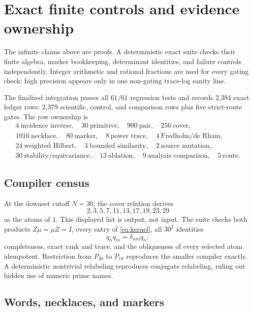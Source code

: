 \section{Exact finite controls and evidence ownership}
\label{sec:exact}

The infinite claims above are proofs. A deterministic exact suite checks their
finite algebra, marker bookkeeping, determinant identities, and failure
controls independently. Integer arithmetic and rational fractions are used
for every gating check; high precision appears only in one non-gating
trace-log sanity line.

The finalized integration passes all \(61/61\) regression tests and records
2,384 exact ledger rows: 2,379 scientific, control, and comparison rows plus
five strict-route gates. The row ownership is
\[
\begin{gathered}
4\ \text{incidence inverse},\quad
30\ \text{primitive},\quad
900\ \text{pair},\quad
256\ \text{cover},\\
1016\ \text{necklace},\quad
80\ \text{marker},\quad
8\ \text{power trace},\quad
4\ \text{Fredholm/de Rham},\\
24\ \text{weighted Hilbert},\quad
3\ \text{bounded similarity},\quad
2\ \text{source mutation},\\
30\ \text{stability/equivariance},\quad
13\ \text{ablation},\quad
9\ \text{analysis comparison},\quad
5\ \text{route}.
\end{gathered}
\]

\subsection{Compiler census}

At the downset cutoff \(N=30\), the cover relation derives
\[
2,3,5,7,11,13,17,19,23,29
\]
as the atoms of \(1\). This displayed list is output, not input. The suite
checks both products \(Z\mu=\mu Z=I\), every entry of
\eqref{eq:kernel}, all \(30^2\) identities
\[
q_nq_m=\delta_{nm}q_n,
\]
completeness, exact rank and trace, and the obliqueness of every selected atom
idempotent. Restriction from \(P_{30}\) to \(P_{18}\) reproduces the smaller
compiler exactly. A deterministic nontrivial relabeling reproduces conjugate
relabeling, ruling out hidden use of numeric prime names.

\subsection{Words, necklaces, and markers}

